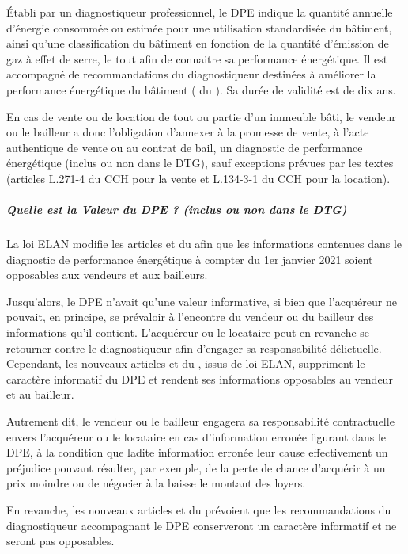 			Établi par un diagnostiqueur professionnel, le DPE indique la quantité annuelle d’énergie consommée ou
			estimée pour une utilisation standardisée du bâtiment, ainsi qu’une classification du bâtiment en fonction
			de la quantité d’émission de gaz à effet de serre, le tout afin de connaitre sa performance énergétique. Il
			est accompagné de recommandations du diagnostiqueur destinées à améliorer la performance
			énergétique du bâtiment ( du \CCH). Sa durée de validité est de dix ans.
			
			En cas de vente ou de location de tout ou partie d’un immeuble bâti, le vendeur ou le bailleur a donc
			l’obligation d’annexer à la promesse de vente, à l’acte authentique de vente ou au contrat de bail, un
			diagnostic de performance énergétique (inclus ou non dans le DTG), sauf exceptions prévues par les textes
			(articles L.271-4 du CCH pour la vente et L.134-3-1 du CCH pour la location).
			
			\subparagraph{Quelle est la Valeur du DPE ? (inclus ou non dans le DTG)}
			
			La loi ELAN modifie les articles  et  du \CCH{} afin que
			les informations contenues dans le diagnostic de performance énergétique à compter du 1er janvier 2021
			soient opposables aux vendeurs et aux bailleurs.
			
			Jusqu’alors, le DPE n’avait qu’une valeur informative, si bien que l’acquéreur ne pouvait, en principe, se
			prévaloir à l’encontre du vendeur ou du bailleur des informations qu’il contient. L’acquéreur ou le locataire
			peut en revanche se retourner contre le diagnostiqueur afin d’engager sa responsabilité délictuelle.
			Cependant, les nouveaux articles  et  du \CCH{}, issus de loi ELAN, suppriment le caractère informatif du DPE et rendent ses informations opposables au vendeur et au bailleur.
			
			Autrement dit, le vendeur ou le bailleur engagera sa responsabilité contractuelle envers l’acquéreur ou le
			locataire en cas d’information erronée figurant dans le DPE, à la condition que ladite information erronée
			leur cause effectivement un préjudice pouvant résulter, par exemple, de la perte de chance d’acquérir à
			un prix moindre ou de négocier à la baisse le montant des loyers.
			
			En revanche, les nouveaux articles  et  du \CCH{} prévoient que les recommandations du	diagnostiqueur accompagnant le DPE conserveront un caractère informatif et ne seront pas opposables.
			
